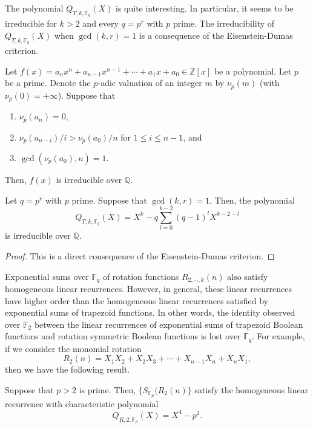 The polynomial $Q_{T,k,\mathbb{F}_q}(X)$ is quite interesting. In particular, it seems to be irreducible for $k > 2$ and every $q=p^r$ with $p$ prime.  The irreducibility of $Q_{T,k,\mathbb{F}_q}(X)$ when $\gcd(k,r)=1$ 
is a consequence of the Eisenstein-Dumas criterion.

\begin{theorem}
Let $f(x)=a_n x^n+a_{n-1}x^{n-1}+\cdots+a_1 x+a_0 \in \mathbb{Z}[x]$ be a polynomial. Let $p$ be a prime. Denote the $p$-adic valuation of an integer $m$ by $\nu_p(m)$ (with $\nu_p(0)=+\infty$).  Suppose that
\begin{enumerate}
 \item $\nu_p(a_n)=0$,
 \item $\nu_p(a_{n-i})/i>\nu_p(a_0)/n$ for $1\leq i \leq n-1$, and
 \item $\gcd(\nu_p(a_0),n)=1$.
\end{enumerate}
Then, $f(x)$ is irreducible over $\mathbb{Q}$.
\end{theorem}

\begin{proposition}
 Let $q=p^r$ with $p$ prime.  Suppose that $\gcd(k,r)=1$.  Then, the polynomial
 \begin{equation}
  Q_{T,k,\mathbb{F}_q}(X)=X^k-q \sum _{l=0}^{k-2} (q-1)^l X^{k-2-l}
 \end{equation}
is irreducible over $\mathbb{Q}$.
\end{proposition}

\begin{proof}
 This is a direct consequence of the Eisenstein-Dumas criterion.
\end{proof}

Exponential sums over $\mathbb{F}_q$ of rotation functions $R_{2,\cdots,k}(n)$ also satisfy homogeneous linear recurrences.  However, in general, these linear recurrences have higher order than the 
homogeneous linear recurrences satisfied by exponential sums of trapezoid functions.  In other words, the identity observed over $\mathbb{F}_2$ between the linear recurrences of exponential sums of trapezoid Boolean functions and rotation symmetric Boolean functions is lost over $\mathbb{F}_q$.
For example, if we consider the monomial rotation 
\begin{equation}
 R_2(n)=X_1X_2+X_2X_3+\cdots+X_{n-1}X_n+X_nX_1,
\end{equation}
then we have the following result. 
\begin{theorem}
\label{thmrot2}
 Suppose that $p>2$ is prime.  Then, $\{S_{\mathbb{F}_p}(R_2(n)\}$ satisfy the homogeneous linear recurrence with characteristic polynomial 
 \begin{equation}
  Q_{R,2,\mathbb{F}_p}(X)=X^{4}-p^{2}.
 \end{equation}
\end{theorem}

